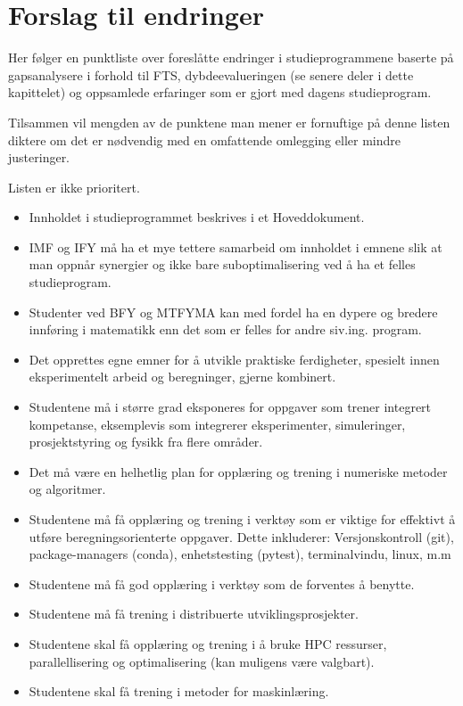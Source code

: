 \section{Forslag til endringer}

Her følger en punktliste over foreslåtte endringer i studieprogrammene baserte på gapsanalysere i forhold til FTS, dybdeevalueringen (se senere deler i dette kapittelet) og oppsamlede erfaringer som er gjort med dagens studieprogram.

Tilsammen vil mengden av de punktene man mener er fornuftige på denne listen diktere om det er nødvendig med en omfattende omlegging eller mindre justeringer.

Listen er ikke prioritert.

\begin{itemize}
	\item Innholdet i studieprogrammet beskrives i et Hoveddokument.
	\item IMF og IFY må ha et mye tettere samarbeid om innholdet i emnene slik at man oppnår synergier og ikke bare suboptimalisering ved å ha et felles studieprogram.
	\item Studenter ved BFY og MTFYMA kan med fordel ha en dypere og bredere innføring i matematikk enn det som er felles for andre siv.ing. program.
	\item Det opprettes egne emner for å utvikle praktiske ferdigheter, spesielt innen eksperimentelt arbeid og beregninger, gjerne kombinert.
	\item Studentene må i større grad eksponeres for oppgaver som trener integrert kompetanse, eksemplevis som integrerer eksperimenter, simuleringer, prosjektstyring og fysikk fra flere områder.
	\item Det må være en helhetlig plan for opplæring og trening i numeriske metoder og algoritmer.
	\item Studentene må få opplæring og trening i verktøy som er viktige for effektivt å utføre beregningsorienterte oppgaver. Dette inkluderer: Versjonskontroll (git), package-managers (conda), enhetstesting (pytest), terminalvindu, linux, m.m
	\item Studentene må få god opplæring i verktøy som de forventes å benytte.
	\item Studentene må få trening i distribuerte utviklingsprosjekter.
	\item Studentene skal få opplæring og trening i å bruke HPC ressurser, parallellisering og optimalisering (kan muligens være valgbart). 
	\item Studentene skal få trening i metoder for maskinlæring. 

\end{itemize}
